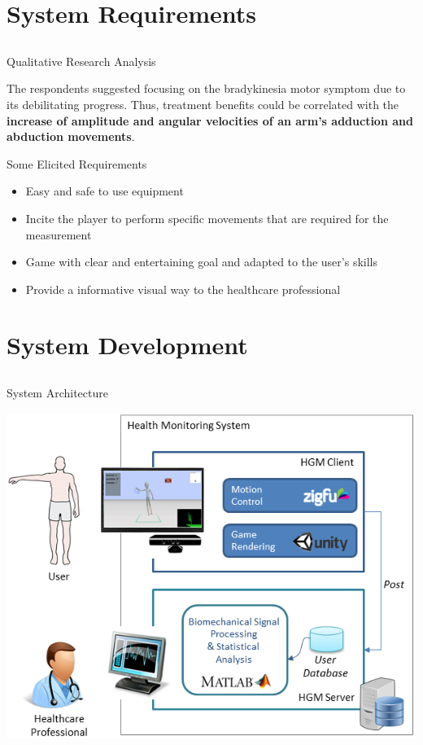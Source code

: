 \documentclass{beamer}
\begin{document}
\section{System Requirements}
\subsection{}
\begin{frame}{Qualitative Research Analysis} 
    \begin{block}{}					
		The respondents suggested focusing on the bradykinesia motor symptom due to its debilitating progress. Thus, treatment benefits could be correlated with the \textbf{increase of amplitude and angular velocities of an arm's adduction and abduction movements}.
    \end{block}
\end{frame} 




\begin{frame}{Some Elicited Requirements}
	\begin{block}{}
		\begin{itemize}[<+->]
			\item	Easy and safe to use equipment
      \item Incite the player to perform specific movements that are required for the measurement 
      \item Game with clear and entertaining goal and adapted to the user's skills
			\item Provide a informative visual way to the healthcare professional
		\end{itemize}
	\end{block}
\end{frame}




\section{System Development}
\subsection{}
\begin{frame}{System Architecture}
		 \begin{block}{}
			\begin{center}
				\includegraphics[height=2.2 in]{img/systemarchitecture3.png}
			\end{center}
		 \end{block}
\end{frame}
\end{document}
